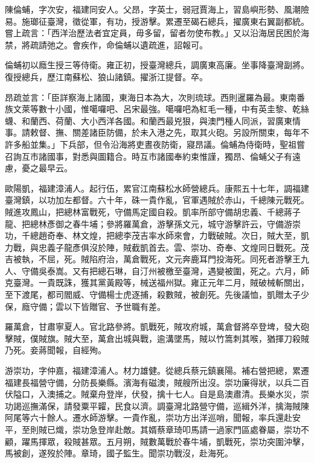 \begin{pinyinscope}
陳倫蜅，字次安，福建同安人。父昂，字英士，弱冠賈海上，習島嶼形勢、風潮險易。施瑯征臺灣，徵從軍，有功，授游擊。累遷至碣石總兵，擢廣東右翼副都統。嘗上疏言：「西洋治歷法者宜定員，毋多留，留者勿使布教。」又以沿海居民困於海禁，將疏請弛之。會疾作，命倫蜅以遺疏進，詔報可。

倫蜅初以廕生授三等侍衛。雍正初，授臺灣總兵，調廣東高廉。坐事降臺灣副將。復授總兵，歷江南蘇松、狼山諸鎮。擢浙江提督。卒。

昂疏並言：「臣詳察海上諸國，東海日本為大，次則琉球。西則暹羅為最。東南番族文萊等數十小國，惟噶囉吧、呂宋最強。噶囉吧為紅毛一種，中有英圭黎、乾絲蠛、和蘭西、荷蘭、大小西洋各國。和蘭西最兇狠，與澳門種人同派，習廣東情事。請敕督、撫、關差諸臣防備，於未入港之先，取其火砲。另設所關束，每年不許多船並集。」下兵部，但令沿海將吏晝夜防衛，寢昂議。倫蜅為侍衛時，聖祖嘗召詢互市諸國事，對悉與圖籍合。時互市諸國奉約束惟謹，獨昂、倫蜅父子有遠慮，憂之最早云。

歐陽凱，福建漳浦人。起行伍，累官江南蘇松水師營總兵。康熙五十七年，調福建臺灣鎮，以功加左都督。六十年，硃一貴作亂，官軍遇賊於赤山，千總陳元戰死。賊進攻鳳山，把總林富戰死，守備馬定國自殺。凱率所部守備胡忠義、千總蔣子龍、把總林彥御之春牛埔；參將羅萬倉，游擊孫文元，城守游擊許云，守備游崇功，千總趙奇奉、林文煌，把總李茂吉率水師來會，力戰破賊。次日，賊大至，凱力戰，與忠義子龍彥俱沒於陣，賊截凱首去。雲、崇功、奇奉、文煌同日戰死。茂吉被執，不屈，死。賊陷府治，萬倉戰死，文元奔鹿耳門投海死。同死者游擊王九人、守備吳泰嵩。又有把總石琳，自汀州被檄至臺灣，遇變被圍，死之。六月，師克臺灣。一貴既誅，獲其黨黃殿等，械送福州獄。雍正元年二月，賊破械斬關出，至下渡尾，都司閻威、守備楊士虎逐捕，殺數賊，被創死。先後議恤，凱贈太子少保，廕守備；雲以下皆贈官、予世職有差。

羅萬倉，甘肅寧夏人。官北路參將。凱戰死，賊攻府城，萬倉督將卒登埤，發大砲擊賊，僕賊旗。賊大至，萬倉出城與戰，逾溝墜馬，賊以竹篙刺其喉，猶揮刀殺賊乃死。妾蔣聞報，自經殉。

游崇功，字仲嘉，福建漳浦人。材力雄健。從總兵蔡元鎮襄陽。補右營把總，累遷福建長福營守備，分防長樂縣。濱海有磁澳，賊艘所出沒。崇功廉得狀，以兵二百伏隘口，入澳捕之。賊棄舟登岸，伏發，擒十七人。自是島澳肅清。長樂水災，崇功謁巡撫滿保，請發粟平糶，民食以濟。調臺灣北路營守備，巡緝外洋，擒海賊陳阿尾等六十餘人。遷水師游擊。一貴作亂，崇功方出洋巡哨，聞報，率兵還赴安平，至則賊已熾，崇功急登岸赴敵。其婿蔡章琦叩馬請一過家門區處眷屬，崇功不顧，躍馬揮眾，殺賊甚眾。五月朔，賊數萬戰於春牛埔，凱戰死，崇功突圍沖擊，馬被創，遂歿於陣。章琦，國子監生。聞崇功戰沒，赴海死。


\end{pinyinscope}